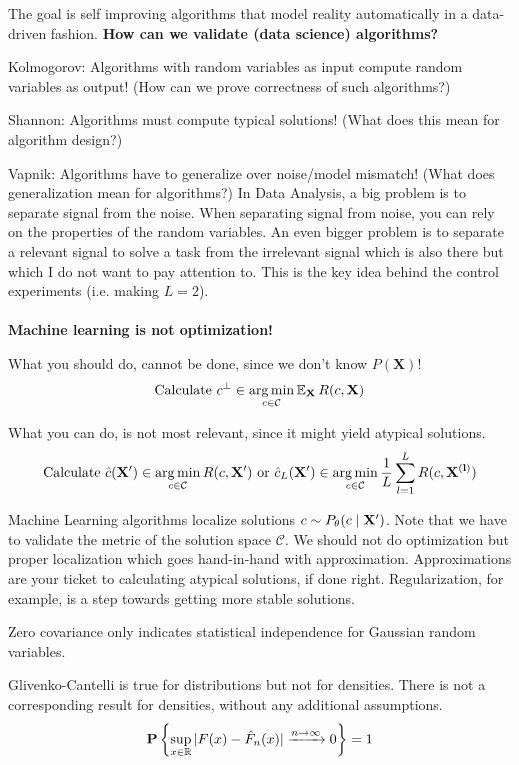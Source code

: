 \documentclass[12pt]{article}
\begin{document}
\item The goal is self improving algorithms that model reality automatically in a data-driven fashion.
\ule
\textbf{How can we validate (data science) algorithms?}
\ulb
\item Kolmogorov: Algorithms with random variables as input compute random variables as output! (How can we prove correctness of such algorithms?)
\item Shannon: Algorithms must compute typical solutions! (What does this mean for algorithm design?)
\item Vapnik: Algorithms have to generalize over
noise/model mismatch! (What does generalization mean for algorithms?)
\ule
In Data Analysis, a big problem is to separate signal from the noise. When separating signal from noise, you can rely on the properties of the random variables. An even bigger problem is to separate  a relevant signal to solve a task from the irrelevant signal which is also there but which I do not want to pay attention to. This is the key idea behind the control experiments (i.e. making $L=2$).
\\\\
\textbf{Machine learning is not optimization!}
\ulb
\item What you should do, cannot be done, since we don't know $P(\mathbf{X})$!
\[ \text{Calculate } c^{\bot} \in \operatorname*{arg\,min}_{c\in\mathcal{C}} \operatorname{\mathbb{E}}_{\mathbf{X}} R(c,\mathbf{X}) \]
\item What you can do, is not most relevant, since it might yield atypical solutions.
\[ \text{Calculate } \hat{c}(\mathbf{X'}) \in \operatorname*{arg\,min}_{c\in\mathcal{C}} R(c,\mathbf{X'}) \text{ or } \hat{c}_L(\mathbf{X'}) \in \operatorname*{arg\,min}_{c\in\mathcal{C}} \frac{1}{L} \sum_{l=1}^L R(c,\mathbf{X^{(l)}}) \]
\item Machine Learning algorithms localize solutions $c\sim P_{\theta}(c\mid \mathbf{X'}) $. Note that we have to validate the metric of the solution space $\mathcal{C}$.
\ule
We should not do optimization but proper localization which goes hand-in-hand with approximation. Approximations are your ticket to calculating atypical solutions, if done right. Regularization, for example, is a step towards getting more stable solutions.
\par Zero covariance only indicates statistical independence for Gaussian random variables.
\par Glivenko-Cantelli is true for distributions but not for densities. There is not a corresponding result for densities, without any additional assumptions.
\[ \mathbf{P} \left\lbrace \sup_{x\in\mathbb{R}} |F(x) - \hat{F}_n(x)| \xrightarrow[]{n\to\infty} 0 \right\rbrace = 1 \]
\end{document}

